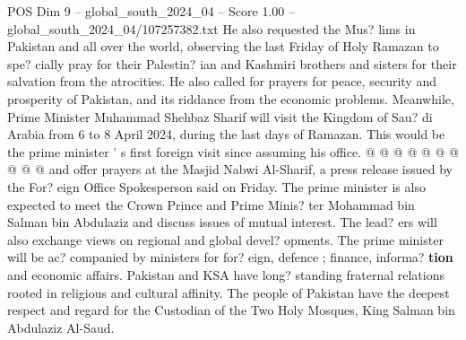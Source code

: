 \begin{textsample}{POS Dim 9 – global\_south\_2024\_04 – Score 1.00 – global\_south\_2024\_04/107257382.txt}
He also requested the Mus? lims in Pakistan and all over the world, observing the last Friday of Holy Ramazan to spe? cially pray for their Palestin? ian and Kashmiri brothers and sisters for their salvation from the atrocities.
He also called for prayers for peace, security and prosperity of Pakistan, and its riddance from the economic problems.
Meanwhile, Prime Minister Muhammad Shehbaz Sharif will visit the Kingdom of Sau? di Arabia from 6 to 8 April 2024, during the last days of Ramazan.
This would be the prime minister ' s first foreign visit since assuming his office. @ @ @ @ @ @ @ @ @ @ and offer prayers at the Masjid Nabwi Al-Sharif, a press release issued by the For? eign Office Spokesperson said on Friday.
The prime minister is also expected to meet the Crown Prince and Prime Minis? ter Mohammad bin Salman bin Abdulaziz and discuss issues of mutual interest.
The lead? ers will also exchange views on regional and global devel? opments.
The prime minister will be ac? companied by ministers for for? eign, defence ; finance, informa? \textbf{tion} and economic affairs.
Pakistan and KSA have long? standing fraternal relations rooted in religious and cultural affinity.
The people of Pakistan have the deepest respect and regard for the Custodian of the Two Holy Mosques, King Salman bin Abdulaziz Al-Saud.

\end{textsample}
